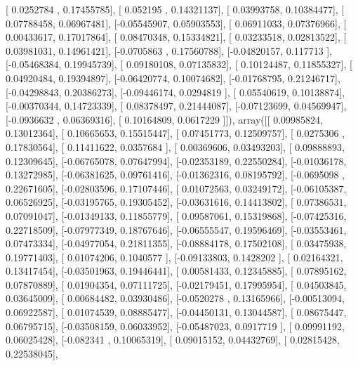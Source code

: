 \documentclass{article}
\begin{document}
       [ 0.0252784 ,  0.17455785],
       [ 0.052195  ,  0.14321137],
       [ 0.03993758,  0.10384477],
       [ 0.07788458,  0.06967481],
       [-0.05545907,  0.05903553],
       [ 0.06911033,  0.07376966],
       [ 0.00433617,  0.17017864],
       [ 0.08470348,  0.15334821],
       [ 0.03233518,  0.02813522],
       [ 0.03981031,  0.14961421],
       [-0.0705863 ,  0.17560788],
       [-0.04820157,  0.117713  ],
       [-0.05468384,  0.19945739],
       [ 0.09180108,  0.07135832],
       [ 0.10124487,  0.11855327],
       [ 0.04920484,  0.19394897],
       [-0.06420774,  0.10074682],
       [-0.01768795,  0.21246717],
       [-0.04298843,  0.20386273],
       [-0.09446174,  0.0294819 ],
       [ 0.05540619,  0.10138874],
       [-0.00370344,  0.14723339],
       [ 0.08378497,  0.21444087],
       [-0.07123699,  0.04569947],
       [-0.0936632 ,  0.06369316],
       [ 0.10164809,  0.0617229 ]]), array([[ 0.09985824,  0.13012364],
       [ 0.10665653,  0.15515447],
       [ 0.07451773,  0.12509757],
       [ 0.0275306 ,  0.17830564],
       [ 0.11411622,  0.0357684 ],
       [ 0.00369606,  0.03493203],
       [ 0.09888893,  0.12309645],
       [-0.06765078,  0.07647994],
       [-0.02353189,  0.22550284],
       [-0.01036178,  0.13272985],
       [-0.06381625,  0.09761416],
       [-0.01362316,  0.08195792],
       [-0.0695098 ,  0.22671605],
       [-0.02803596,  0.17107446],
       [ 0.01072563,  0.03249172],
       [-0.06105387,  0.06526925],
       [-0.03195765,  0.19305452],
       [-0.03631616,  0.14413802],
       [ 0.07386531,  0.07091047],
       [-0.01349133,  0.11855779],
       [ 0.09587061,  0.15319868],
       [-0.07425316,  0.22718509],
       [-0.07977349,  0.18767646],
       [-0.06555547,  0.19596469],
       [-0.03553461,  0.07473334],
       [-0.04977054,  0.21811355],
       [-0.08884178,  0.17502108],
       [ 0.03475938,  0.19771403],
       [ 0.01074206,  0.1040577 ],
       [-0.09133803,  0.1428202 ],
       [ 0.02164321,  0.13417454],
       [-0.03501963,  0.19446441],
       [ 0.00581433,  0.12345885],
       [ 0.07895162,  0.07870889],
       [ 0.01904354,  0.07111725],
       [-0.02179451,  0.17995954],
       [ 0.04503845,  0.03645009],
       [ 0.00684482,  0.03930486],
       [-0.0520278 ,  0.13165966],
       [-0.00513094,  0.06922587],
       [ 0.01074539,  0.08885477],
       [-0.04450131,  0.13044587],
       [ 0.08675447,  0.06795715],
       [-0.03508159,  0.06033952],
       [-0.05487023,  0.0917719 ],
       [ 0.09991192,  0.06025428],
       [-0.082341  ,  0.10065319],
       [ 0.09015152,  0.04432769],
       [ 0.02815428,  0.22538045],
\end{document}
